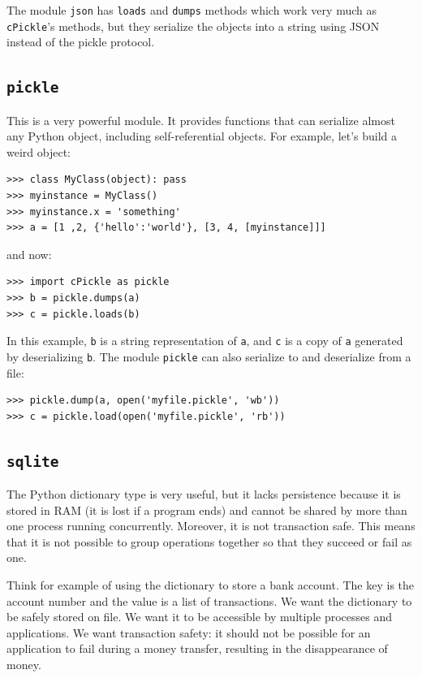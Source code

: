 \documentclass[justified,sixbynine]{tufte-book}
\def\ft{\small\tt}
\theoremstyle{plain}%
\theoremstyle{definition}
\theoremstyle{remark}
\begin{document}
\begin{fullwidth}
The module {\ft json} has {\ft loads} and {\ft dumps} methods which work very much as {\ft cPickle}'s methods, but they serialize the objects into a string using JSON instead of the pickle protocol.

\goodbreak\subsection{{\ft pickle}}


This is a very powerful module. It provides functions that can serialize almost any Python object, including self-referential objects. For example, let's build a weird object:
\begin{lstlisting}
>>> class MyClass(object): pass
>>> myinstance = MyClass()
>>> myinstance.x = 'something'
>>> a = [1 ,2, {'hello':'world'}, [3, 4, [myinstance]]]
\end{lstlisting}
\noindent and now:
\begin{lstlisting}
>>> import cPickle as pickle
>>> b = pickle.dumps(a)
>>> c = pickle.loads(b)
\end{lstlisting}

In this example, {\ft b} is a string representation of {\ft a}, and {\ft c} is a copy of {\ft a} generated by deserializing {\ft b}.
\noindent The module {\ft pickle} can also serialize to and deserialize from a file:
\begin{lstlisting}
>>> pickle.dump(a, open('myfile.pickle', 'wb'))
>>> c = pickle.load(open('myfile.pickle', 'rb'))
\end{lstlisting}

\goodbreak\subsection{{\ft sqlite}}


The Python dictionary type is very useful, but it lacks persistence because it is stored in RAM (it is lost if a program ends) and cannot be shared by more than one process running concurrently. Moreover, it is not transaction safe. This means that it is not possible to group operations together so that they succeed or fail as one.

Think for example of using the dictionary to store a bank account. The key is the account number and the value is a list of transactions. We want the dictionary to be safely stored on file. We want it to be accessible by multiple processes and applications. We want transaction safety: it should not be possible for an application to fail during a money transfer, resulting in the disappearance of money.


\end{fullwidth}
\end{document}
